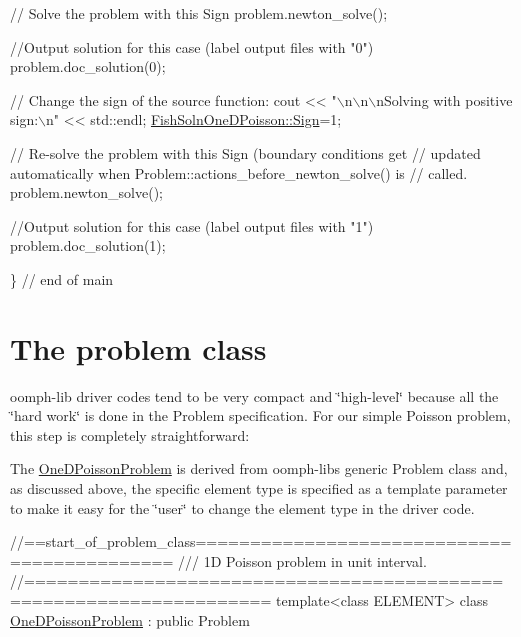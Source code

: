 \begin{DoxyCodeInclude}
 \textcolor{comment}{// Solve the problem with this Sign}
 problem.newton\_solve();

 \textcolor{comment}{//Output solution for this case (label output files with "0")}
 problem.doc\_solution(0);


 \textcolor{comment}{// Change the sign of the source function:}
 cout << \textcolor{stringliteral}{"\(\backslash\)n\(\backslash\)n\(\backslash\)nSolving with positive sign:\(\backslash\)n"} << std::endl;
 \hyperlink{namespaceFishSolnOneDPoisson_a108e814ef887ffcc8caa7c65a7d30f06}{FishSolnOneDPoisson::Sign}=1;

 \textcolor{comment}{// Re-solve the problem with this Sign (boundary conditions get}
 \textcolor{comment}{// updated automatically when Problem::actions\_before\_newton\_solve() is}
 \textcolor{comment}{// called.}
 problem.newton\_solve();

 \textcolor{comment}{//Output solution for this case (label output files with "1")}
 problem.doc\_solution(1);

\} \textcolor{comment}{// end of main}

\end{DoxyCodeInclude}




 

\hypertarget{index_problem}{}\section{The problem class}\label{index_problem}
{\ttfamily oomph-\/lib} driver codes tend to be very compact and \char`\"{}high-\/level\char`\"{} because all the \char`\"{}hard work\char`\"{} is done in the {\ttfamily Problem} specification. For our simple Poisson problem, this step is completely straightforward\+:

The {\ttfamily \hyperlink{classOneDPoissonProblem}{One\+D\+Poisson\+Problem}} is derived from {\ttfamily oomph-\/lib\textquotesingle{}s} generic {\ttfamily Problem} class and, as discussed above, the specific element type is specified as a template parameter to make it easy for the \char`\"{}user\char`\"{} to change the element type in the driver code.

 
\begin{DoxyCodeInclude}
\textcolor{comment}{//==start\_of\_problem\_class============================================}
\textcolor{comment}{/// 1D Poisson problem in unit interval.}
\textcolor{comment}{}\textcolor{comment}{//====================================================================}
\textcolor{keyword}{template}<\textcolor{keyword}{class} ELEMENT> 
\textcolor{keyword}{class }\hyperlink{classOneDPoissonProblem}{OneDPoissonProblem} : \textcolor{keyword}{public} Problem

\end{DoxyCodeInclude}



